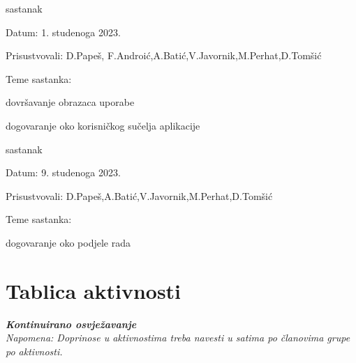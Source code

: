 \begin{packed_enum}
			\item  sastanak
			\item[] \begin{packed_item}
				\item Datum: 1. studenoga 2023.
				\item Prisustvovali: D.Papeš, F.Androić,A.Batić,V.Javornik,M.Perhat,D.Tomšić
				\item Teme sastanka:
				\begin{packed_item}
					\item  dovršavanje obrazaca uporabe
					\item dogovaranje oko korisničkog sučelja aplikacije
				\end{packed_item}
			\end{packed_item}
			
			\item  sastanak
			\item[] \begin{packed_item}
				\item Datum: 9. studenoga 2023.
				\item Prisustvovali: D.Papeš,A.Batić,V.Javornik,M.Perhat,D.Tomšić
				\item Teme sastanka:
				\begin{packed_item}
					\item dogovaranje oko podjele rada
				\end{packed_item}
			\end{packed_item}			
			
			
		\end{packed_enum}
		
		\eject
		\section*{Tablica aktivnosti}
		
			\textbf{\textit{Kontinuirano osvježavanje}}\\
			
			 \textit{Napomena: Doprinose u aktivnostima treba navesti u satima po članovima grupe po aktivnosti.}


